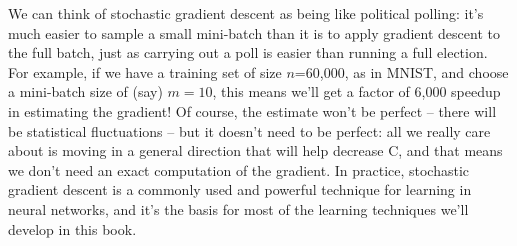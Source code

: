 \documentclass[a4paper,twoside,10pt]{book}
\begin{document}
We can think of stochastic gradient descent as being like political polling: it's much easier to sample a small mini-batch than it is to apply gradient descent to the full batch, just as carrying out a poll is easier than running a full election. For example, if we have a training set of size $n$=60,000, as in MNIST, and choose a mini-batch size of (say) $m=10$, this means we'll get a factor of 6,000 speedup in estimating the gradient! Of course, the estimate won't be perfect -- there will be statistical fluctuations -- but it doesn't need to be perfect: all we really care about is moving in a general direction that will help decrease C, and that means we don't need an exact computation of the gradient. In practice, stochastic gradient descent is a commonly used and powerful technique for learning in neural networks, and it's the basis for most of the learning techniques we'll develop in this book.
\end{document}
